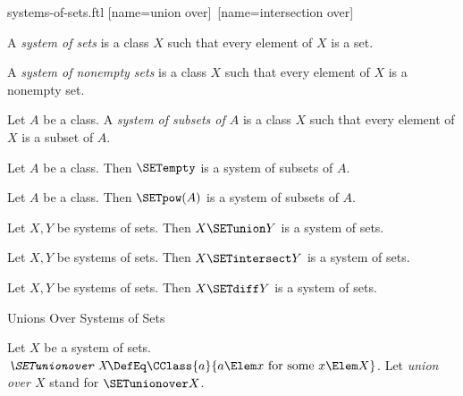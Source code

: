 \documentclass{stex}
\begin{document}
\begin{smodule}{systems-of-sets.ftl}
[name=union over]{\bigcup\,}
[name=intersection over]{\bigcap\,}

\begin{definition}[forthel,for=system of sets]
  A \emph{system of sets} is a class $X$ such that every element of $X$ is a set.
\end{definition}

\begin{definition}[forthel,for=system of nonempty sets]
  A \emph{system of nonempty sets} is a class $X$ such that every element of $X$ is a nonempty set.
\end{definition}

\begin{definition}[forthel,for=system of subsets]
  Let $A$ be a class.
  A \emph{system of subsets of $A$} is a class $X$ such that every element of $X$ is a subset of $A$.
\end{definition}

\begin{proposition}[forthel]
  Let $A$ be a class.
  Then $\SETempty$ is a system of subsets of $A$.
\end{proposition}

\begin{proposition}[forthel]
  Let $A$ be a class.
  Then $\SETpow(A)$ is a system of subsets of $A$.
\end{proposition}

\begin{proposition}[forthel]
  Let $X, Y$ be systems of sets.
  Then $X \SETunion Y$ is a system of sets.
\end{proposition}

\begin{proposition}[forthel]
  Let $X, Y$ be systems of sets.
  Then $X \SETintersect Y$ is a system of sets.
\end{proposition}

\begin{proposition}[forthel]
  Let $X, Y$ be systems of sets.
  Then $X \SETdiff Y$ is a system of sets.
\end{proposition}

\begin{sfragment}{Unions Over Systems of Sets}
  \begin{definition}[forthel,for=union over]
    Let $X$ be a system of sets.
    $\emph{\SETunionover X} \DefEq \CClass{a}{a \Elem x\text{ for some }x \Elem X}$.
    Let \emph{union over $X$} stand for $\SETunionover X$.
  \end{definition}


\end{sfragment}
\end{smodule}
\end{document}

